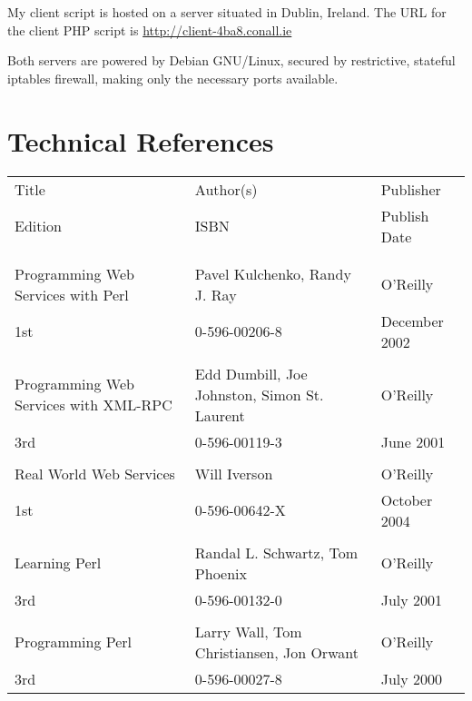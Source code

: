 \documentclass[a4paper,10pt]{article}
\begin{document}
My client script is hosted on a server situated in Dublin, Ireland. The
URL for the client PHP script is
\url{http://client-4ba8.conall.ie}


Both servers are powered by Debian GNU/Linux, secured by restrictive, 
stateful iptables firewall, making only the necessary ports available.

\section{Technical References}

\begin{tabular}{lll}
Title	&	Author(s)	&	Publisher	\\
Edition	&	ISBN	&	Publish Date 	\\
			&			&						\\
			&			&						\\
Programming Web Services with Perl	&	Pavel Kulchenko,  Randy J. Ray	&
O'Reilly	\\
1st&	0-596-00206-8 & December 2002	\\
			&			&						\\
Programming Web Services with XML-RPC & Edd Dumbill, Joe Johnston, Simon
St. Laurent &	O'Reilly	\\
3rd & 0-596-00119-3	&	June 2001	\\
			&			&						\\
Real World Web Services	&	Will Iverson	&	O'Reilly	\\
1st & 0-596-00642-X	&	October 2004	\\
			&			&						\\
Learning Perl	&	Randal L. Schwartz, Tom Phoenix	&	O'Reilly	\\
3rd  		&	0-596-00132-0	&	July 2001	\\
			&			&						\\
Programming Perl	&	Larry Wall, Tom Christiansen, Jon Orwant	&
O'Reilly	\\
3rd		&	0-596-00027-8	&	July 2000	\\
\end{tabular}
\end{document}
